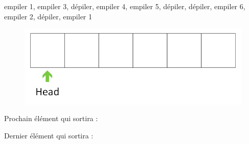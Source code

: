 \documentclass[11pt,a4paper]{article}
\begin{document}
\begin{center}

\begin{large}
empiler 1, empiler 3, dépiler, empiler 4, empiler 5, dépiler, dépiler, empiler 6, empiler 2, dépiler, empiler 1
\end{large}


\begin{figure}[ht!]
\centering
\centerline{  %
\includegraphics[scale=1]{img/empty_head_2.png}
}
\end{figure}


\vspace*{-0.75cm}




\begin{table}[ht!]
  \begin{minipage}{0.50\textwidth}

Prochain élément qui sortira :

  \end{minipage}
  \hfillx
  \begin{minipage}{0.50\textwidth}

Dernier élément qui sortira :

  \end{minipage}
\end{table}
\end{center}
\end{document}
